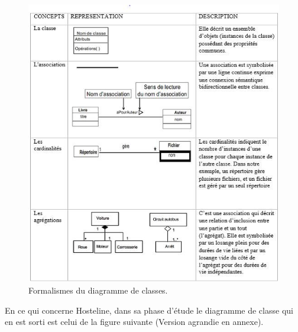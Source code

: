 \begin{figure}[!htbp]
	\begin{center}
		\includegraphics[scale=0.95]{images/form_classe.png}
		\caption{Formalismes du diagramme de classes.}
		\label{use_case_summary}
	\end{center}
\end{figure}
\cleardoublepage
En ce qui concerne Hosteline, dans sa phase d’étude le diagramme de classe qui en est sorti est celui de la figure suivante (Version agrandie en annexe).

